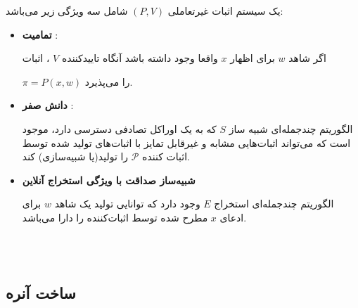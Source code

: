 یک سیستم اثبات غیرتعاملی 
$(P,V)$
شامل سه ویژگی زیر می‌باشد:
\begin{itemize}
	
\item[]{\bf تمامیت} :
	
‌اگر شاهد 
$w$
برای اظهار
$x$
واقعا وجود داشته باشد آنگاه تاییدکننده 
$V$
، اثبات
 
$\pi = P(x,w)$
را می‌پذیرد. 
	
\item[]{\bf دانش صفر} :
	
 الگوریتم چندجمله‌ای شبیه ساز 
$S$
که به یک اوراکل تصادفی دسترسی دارد، موجود است که می‌تواند اثبات‌هایی مشابه و غیرقابل تمایز با اثبات‌های تولید شده توسط اثبات کننده
$\mathcal{P}$
 را تولید(یا شبیه‌سازی) کند.
 \iffalse
  الگوریتم شبیه‌ساز به وسیله دو الگوریتم  \\
$S = (S_{init} , S_P)$
 بیان می‌شود.
\fi	 
\item[]{\bf شبیه‌ساز صداقت با ویژگی استخراج آنلاین }
	
 الگوریتم چندجمله‌ای استخراج
$E$
وجود دارد که توانایی تولید یک شاهد 
$w$
برای ادعای 
$x$
مطرح شده توسط اثبات‌کننده  را دارا می‌باشد.
\end{itemize}~
\\
\\
\subsection{ساخت آنره}\label{unruh_constuction}

